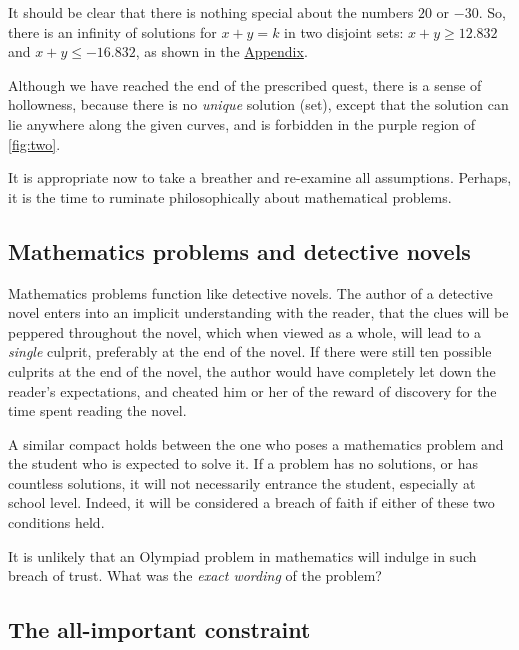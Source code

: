 \documentclass[
  a4paper,
]{article}
\begin{document}
It should be clear that there is nothing special about the numbers
\(20\) or \(-30\). So, there is an infinity of solutions for
\(x + y = k\) in two disjoint sets: \(x + y \geq 12.832\) and
\(x + y \leq -16.832\), as shown in the
\protect\hyperlink{appendix}{Appendix}.

Although we have reached the end of the prescribed quest, there is a
sense of hollowness, because there is no \emph{unique} solution (set),
except that the solution can lie anywhere along the given curves, and is
forbidden in the purple region of \cref{fig:two}.

It is appropriate now to take a breather and re-examine all assumptions.
Perhaps, it is the time to ruminate philosophically about mathematical
problems.

\hypertarget{mathematics-problems-and-detective-novels}{%
\subsection{Mathematics problems and detective
novels}\label{mathematics-problems-and-detective-novels}}

Mathematics problems function like detective novels. The author of a
detective novel enters into an implicit understanding with the reader,
that the clues will be peppered throughout the novel, which when viewed
as a whole, will lead to a \emph{single} culprit, preferably at the end
of the novel. If there were still ten possible culprits at the end of
the novel, the author would have completely let down the reader's
expectations, and cheated him or her of the reward of discovery for the
time spent reading the novel.

A similar compact holds between the one who poses a mathematics problem
and the student who is expected to solve it. If a problem has no
solutions, or has countless solutions, it will not necessarily entrance
the student, especially at school level. Indeed, it will be considered a
breach of faith if either of these two conditions held.

It is unlikely that an Olympiad problem in mathematics will indulge in
such breach of trust. What was the \emph{exact wording} of the problem?

\hypertarget{the-all-important-constraint}{%
\subsection{The all-important
constraint}\label{the-all-important-constraint}}
\end{document}
